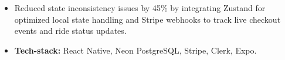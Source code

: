 \documentclass[a4paper, 10pt]{article}
\begin{document}
\begin{itemize}[itemsep=1pt,leftmargin=0in, label={}]
\begin{itemize}[itemsep=1pt]
            \item Reduced state inconsistency issues by 45\% by integrating Zustand for optimized local state handling and Stripe webhooks to track live checkout events and ride status updates. 
            
            \item \textbf{Tech-stack:} React Native, Neon PostgreSQL, Stripe, Clerk, Expo.
        \end{itemize}
    \end{itemize}
\end{document}
